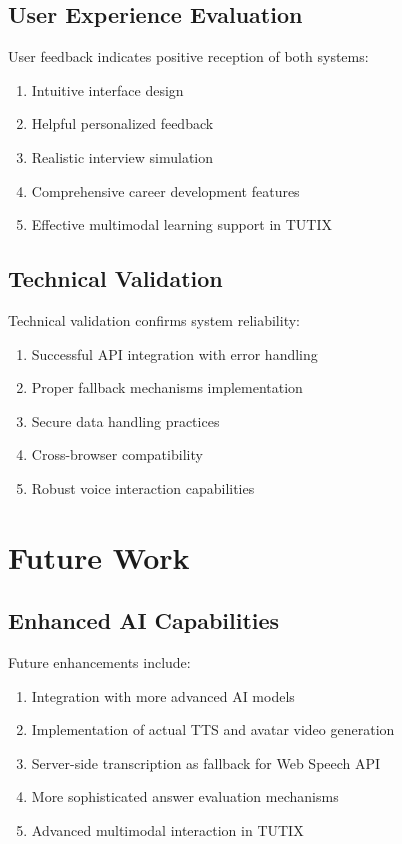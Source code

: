 \documentclass[12pt, conference]{IEEEtran}
\begin{document}
\subsection{User Experience Evaluation}

User feedback indicates positive reception of both systems:
\begin{enumerate}
    \item Intuitive interface design
    \item Helpful personalized feedback
    \item Realistic interview simulation
    \item Comprehensive career development features
    \item Effective multimodal learning support in TUTIX
\end{enumerate}

\subsection{Technical Validation}

Technical validation confirms system reliability:
\begin{enumerate}
    \item Successful API integration with error handling
    \item Proper fallback mechanisms implementation
    \item Secure data handling practices
    \item Cross-browser compatibility
    \item Robust voice interaction capabilities
\end{enumerate}

\section{Future Work}

\subsection{Enhanced AI Capabilities}

Future enhancements include:
\begin{enumerate}
    \item Integration with more advanced AI models
    \item Implementation of actual TTS and avatar video generation
    \item Server-side transcription as fallback for Web Speech API
    \item More sophisticated answer evaluation mechanisms
    \item Advanced multimodal interaction in TUTIX
\end{enumerate}
\end{document}
